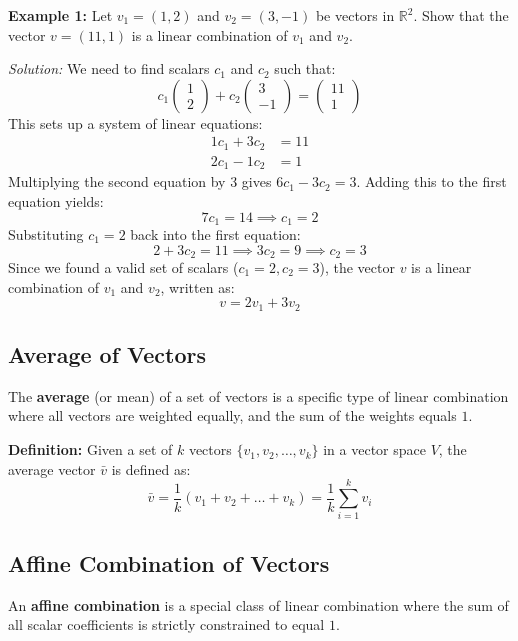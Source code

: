\documentclass[11pt, a4paper]{article}
\begin{document}
	
	
	\noindent \textbf{Example 1:} Let $v_1 = (1, 2)$ and $v_2 = (3, -1)$ be vectors in $\mathbb{R}^2$. Show that the vector $v = (11, 1)$ is a linear combination of $v_1$ and $v_2$.
	
	\noindent \textit{Solution:} We need to find scalars $c_1$ and $c_2$ such that:
	\[
	c_1 \begin{pmatrix} 1 \\ 2 \end{pmatrix} + c_2 \begin{pmatrix} 3 \\ -1 \end{pmatrix} = \begin{pmatrix} 11 \\ 1 \end{pmatrix}
	\]
	This sets up a system of linear equations:
	\begin{align*}
		1c_1 + 3c_2 &= 11 \\
		2c_1 - 1c_2 &= 1
	\end{align*}
	Multiplying the second equation by 3 gives $6c_1 - 3c_2 = 3$. Adding this to the first equation yields:
	\[
	7c_1 = 14 \implies c_1 = 2
	\]
	Substituting $c_1 = 2$ back into the first equation:
	\[
	2 + 3c_2 = 11 \implies 3c_2 = 9 \implies c_2 = 3
	\]
	Since we found a valid set of scalars ($c_1 = 2, c_2 = 3$), the vector $v$ is a linear combination of $v_1$ and $v_2$, written as:
	\[
	v = 2v_1 + 3v_2
	\]
	
	\subsection*{Average of Vectors}
	The \textbf{average} (or mean) of a set of vectors is a specific type of linear combination where all vectors are weighted equally, and the sum of the weights equals $1$. 
	
	\noindent \textbf{Definition:} Given a set of $k$ vectors $\{v_1, v_2, \dots, v_k\}$ in a vector space $V$, the average vector $\bar{v}$ is defined as:
	\[
	\bar{v} = \frac{1}{k}(v_1 + v_2 + \dots + v_k) = \frac{1}{k}\sum_{i=1}^{k} v_i
	\]
	
	\subsection*{Affine Combination of Vectors}
	An \textbf{affine combination} is a special class of linear combination where the sum of all scalar coefficients is strictly constrained to equal $1$. 
	
\end{document}
